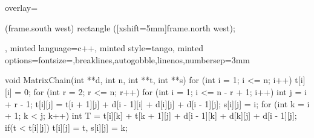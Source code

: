 \documentclass{article}
\begin{document}
\begin{homeworkProblem}
\begin{tcblisting}
{overlay={\begin{tcbclipinterior} (frame.south west)
rectangle ([xshift=5mm]frame.north west);\end{tcbclipinterior}},
minted language=c++,
minted style=tango,
minted options={fontsize=\small,breaklines,autogobble,linenos,numbersep=3mm}}
void MatrixChain(int **d, int n, int **t, int **s) {
    for (int i = 1; i <= n; i++) t[i][i] = 0;
    for (int r = 2; r <= n; r++){
        for (int i = 1; i <= n - r + 1; i++){
            int j = i + r - 1;
            t[i][j] = t[i + 1][j] + d[i - 1][i] + d[i][j] + d[i - 1][j];
            s[i][j] = i;
            for (int k = i + 1; k < j; k++){
                int T = t[i][k] + t[k + 1][j] + d[i - 1][k] + d[k][j] + d[i - 1][j];
                if(t < t[i][j]) {
                    t[i][j] = t, s[i][j] = k; 
                }
            }
        }
    }
}
\end{tcblisting}
\end{homeworkProblem}




\end{document}
